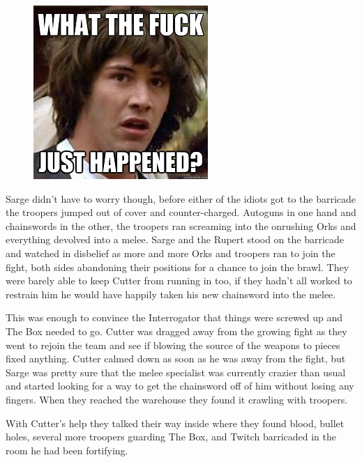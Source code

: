 \begin{figure}
	\begin{center}
		\includegraphics[width=\figwidth]{pics/4/21.png}
	\end{center}
\end{figure}
Sarge didn't have to worry though, before either of the idiots got to the barricade the troopers jumped out of cover and counter-charged. 
Autoguns in one hand and chainswords in the other, the troopers ran screaming into the onrushing Orks and everything devolved into a melee. 
Sarge and the Rupert stood on the barricade and watched in disbelief as more and more Orks and troopers ran to join the fight, both sides abandoning their positions for a chance to join the brawl. 
They were barely able to keep Cutter from running in too, if they hadn't all worked to restrain him he would have happily taken his new chainsword into the melee.

This was enough to convince the Interrogator that things were screwed up and The Box needed to go. 
Cutter was dragged away from the growing fight as they went to rejoin the team and see if blowing the source of the weapons to pieces fixed anything. 
Cutter calmed down as soon as he was away from the fight, but Sarge was pretty sure that the melee specialist was currently crazier than usual and started looking for a way to get the chainsword off of him without losing any fingers.
When they reached the warehouse they found it crawling with troopers.

With Cutter's help they talked their way inside where they found blood, bullet holes, several more troopers guarding The Box, and Twitch barricaded in the room he had been fortifying.

